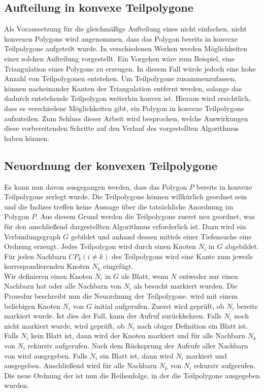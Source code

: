 \documentclass[ngerman]{seminarbeitrag}
\begin{document}
\subsection{Aufteilung in konvexe Teilpolygone}\label{aufteilung}
Als Voraussetzung für die gleichmäßige Aufteilung eines nicht einfachen, nicht konvexen Polygons wird angenommen, dass das Polygon bereits in konvexe Teilpolygone aufgeteilt wurde. In verschiedenen Werken werden Möglichkeiten einer solchen Aufteilung vorgestellt. Ein Vorgehen wäre zum Beispiel, eine Triangulation eines Polygons zu erzeugen. In diesem Fall würde jedoch eine hohe Anzahl von Teilpolygonen entstehen. Um Teilpolygone zusammenzufassen, können nacheinander Kanten der Triangulation entfernt werden, solange das dadurch entstehende Teilpolygon weiterhin konvex ist.
Hieraus wird ersichtlich, dass es verschiedene Möglichkeiten gibt, ein Polygon in konvexe Teilpolygone aufzuteilen. Zum Schluss dieser Arbeit wird besprochen, welche Auswirkungen diese vorbereitenden Schritte auf den Verlauf des vorgestellten Algorithmus haben können.

\subsection{Neuordnung der konvexen Teilpolygone}\label{ordnung}
Es kann nun davon ausgegangen werden, dass das Polygon $P$ bereits in konvexe Teilpolygone \cpp zerlegt wurde. Die Teilpolygone können willkürlich geordnet sein und die Indizes treffen keine Aussage über die tatsächliche Anordnung im Polygon $P$. Aus diesem Grund werden die Teilpolygone zuerst neu geordnet, was für den anschließend dargestellten Algorithmus erforderlich ist. Dazu wird ein Verbindungsgraph $G$ gebildet und anhand dessen mittels einer Tiefensuche eine Ordnung erzeugt. Jedes Teilpolygon \cpi wird durch einen Knoten $N_{i}$ in $G$ abgebildet. Für jeden Nachbarn $CP_{k} (i \ne k)$ des Teilpolygons \cpi wird eine Kante zum jeweils korrespondierenden Knoten $N_{k}$ eingefügt. \\
Wir definieren einen Knoten $N_{i}$ in $G$ als Blatt, wenn $N_{}$ entweder nur einen Nachbarn hat oder alle Nachbarn von $N_{i}$ als besucht markiert wurden.
Die Prozedur \ord beschreibt nun die Neuordnung der Teilpolygone. \ord wird mit einem beliebigen Knoten $N_{i}$ von $G$ initial aufgerufen. Zuerst wird geprüft, ob $N_{i}$ bereits markiert wurde. Ist dies der Fall, kann der Aufruf zurückkehren. Falls $N_{i}$ noch nicht markiert wurde, wird geprüft, ob $N_{i}$ nach obiger Definition ein Blatt ist. Falls $N_{i}$ kein Blatt ist, dann wird der Knoten markiert und für alle Nachbarn $N_{k}$ von $N_{i}$ rekursiv \ord aufgerufen. Nach dem Rücksprung der Aufrufe aller Nachbarn von \cpi wird \cpi ausgegeben. Falls $N_{i}$ ein Blatt ist, dann wird $N_{i}$ markiert und \cpi ausgegeben. Anschließend wird für alle Nachbarn $N_{k}$ von $N_{i}$ rekursiv \ord aufgerufen.
Die neue Ordnung der \cpi ist nun die Reihenfolge, in der die Teilpolygone ausgegeben wurden.
\end{document}
